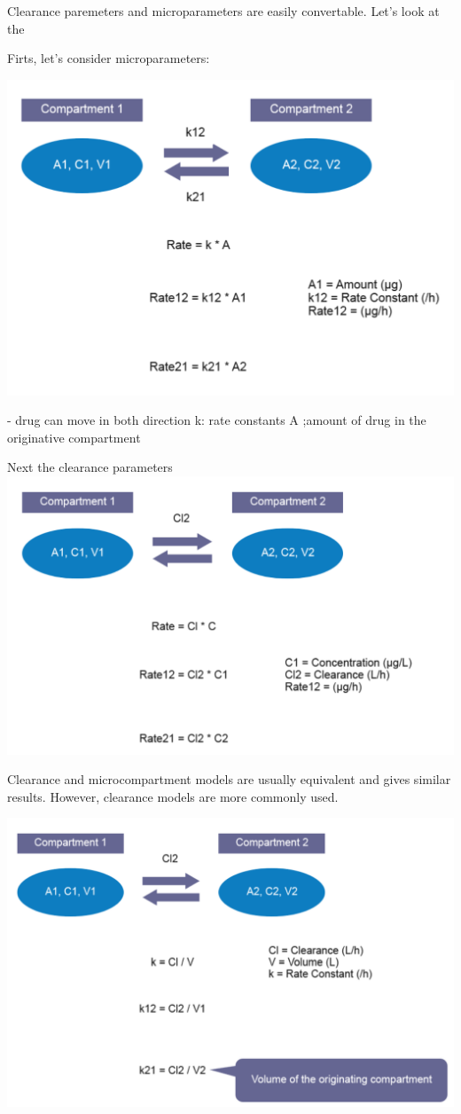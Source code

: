 \documentclass[
  letterpaper,
  DIV=11,
  numbers=noendperiod]{scrreprt}
\begin{document}
Clearance paremeters and microparameters are easily convertable. Let's
look at the

Firts, let's consider microparameters:

\includegraphics[width=5.96875in,height=\textheight]{./img/param-2.png}

- drug can move in both direction k: rate constants A ;amount of drug in
the originative compartment

Next the clearance parameters
\includegraphics[width=5.94792in,height=\textheight]{./img/param-3.png}

Clearance and microcompartment models are usually equivalent and gives
similar results. However, clearance models are more commonly used.

\includegraphics{./img/param-4.png}
\end{document}
